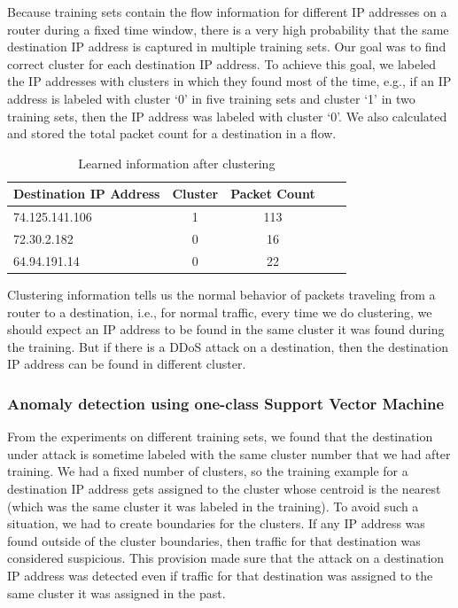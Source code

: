 \documentclass[12pt,oneside,a4paper]{article}
\begin{document}
Because training sets contain the flow information for different IP addresses on a router during a fixed time window, there is a very high probability that the same destination IP address is captured in multiple training sets. Our goal was to find correct cluster for each destination IP address. To achieve this goal, we labeled the IP addresses with clusters in which they found most of the time, e.g., if an IP address is labeled with cluster `0' in five training sets and cluster `1' in two training sets, then the IP address was labeled with cluster `0'. We also calculated and stored the total packet count for a destination in a flow.

\begin{table}[H]
\centering
  \begin{tabular}{| l | c | c | c | c |}
    \hline
    {Destination IP Address}  &Cluster  &Packet Count \\
    \hline
    74.125.141.106  & 1     & 113  \\ \hline
    72.30.2.182     & 0     & 16   \\ \hline
    64.94.191.14    & 0     & 22   \\ \hline
  \end{tabular}
\caption{Learned information after clustering} \label{table:learned-clustering}
\end{table}

Clustering information tells us the normal behavior of packets traveling from a router to a destination, i.e., for normal traffic, every time we do clustering, we should expect an IP address to be found in the same cluster it was found during the training. But if there is a DDoS attack on a destination, then the destination IP address can be found in different cluster.

\subsubsection{Anomaly detection using one-class Support Vector Machine} \label{subsec:Anomaly_Detection}

From the experiments on different training sets, we found that the destination under attack is sometime labeled with the same cluster number that we had after training. We had a fixed number of clusters, so the training example for a destination IP address gets assigned to the cluster whose centroid is the nearest (which was the same cluster it was labeled in the training). To avoid such a situation, we had to create boundaries for the clusters. If any IP address was found outside of the cluster boundaries, then traffic for that destination was considered suspicious. This provision made sure that the attack on a destination IP address was detected even if traffic for that destination was assigned to the same cluster it was assigned in the past.
\end{document}
